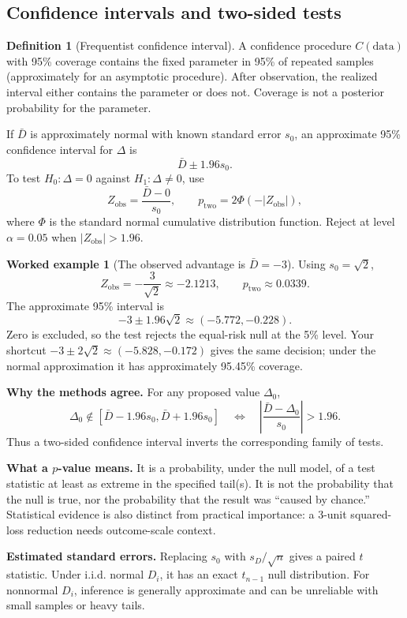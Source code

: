 \documentclass[11pt,letterpaper]{article}
\theoremstyle{definition}
\newtheorem{definition}[theorem]{Definition}
\newtheorem{example}[theorem]{Worked example}
\theoremstyle{remark}
\numberwithin{equation}{section}
\begin{document}
\subsection{Confidence intervals and two-sided tests}
\begin{definition}[Frequentist confidence interval]
A confidence procedure $C(\text{data})$ with 95\% coverage contains the fixed
parameter in 95\% of repeated samples (approximately for an asymptotic procedure).
After observation, the realized interval either contains the parameter or does
not. Coverage is not a posterior probability for the parameter.
\end{definition}
If $\bar D$ is approximately normal with known standard error $s_0$, an approximate
95\% confidence interval for $\Delta$ is
\begin{equation}
\bar D\pm1.96s_0.
\end{equation}
To test $H_0:\Delta=0$ against $H_1:\Delta\neq0$, use
\[
Z_{\mathrm{obs}}=\frac{\bar D-0}{s_0},\qquad
p_{\mathrm{two}}=2\Phi(-|Z_{\mathrm{obs}}|),
\]
where $\Phi$ is the standard normal cumulative distribution function.
Reject at level $\alpha=0.05$ when $|Z_{\mathrm{obs}}|>1.96$.

\begin{example}[The observed advantage is $\bar D=-3$]
Using $s_0=\sqrt2$,
\[
Z_{\mathrm{obs}}=-\frac3{\sqrt2}\approx-2.1213,
\qquad p_{\mathrm{two}}\approx0.0339.
\]
The approximate 95\% interval is
\[
-3\pm1.96\sqrt2\approx(-5.772,-0.228).
\]
Zero is excluded, so the test rejects the equal-risk null at the 5\% level.
Your shortcut $-3\pm2\sqrt2\approx(-5.828,-0.172)$ gives the same decision;
under the normal approximation it has approximately 95.45\% coverage.
\end{example}
\textbf{Why the methods agree.} For any proposed value $\Delta_0$,
\[
\Delta_0\notin[\bar D-1.96s_0,\bar D+1.96s_0]
\quad\Longleftrightarrow\quad
\left|\frac{\bar D-\Delta_0}{s_0}\right|>1.96.
\]
Thus a two-sided confidence interval inverts the corresponding family of tests.

\textbf{What a $p$-value means.} It is a probability, under the null model, of a
test statistic at least as extreme in the specified tail(s). It is not the
probability that the null is true, nor the probability that the result was
``caused by chance.'' Statistical evidence is also distinct from practical
importance: a 3-unit squared-loss reduction needs outcome-scale context.

\textbf{Estimated standard errors.} Replacing $s_0$ with $s_D/\sqrt n$ gives a
paired $t$ statistic. Under i.i.d. normal $D_i$, it has an exact $t_{n-1}$ null
distribution. For nonnormal $D_i$, inference is generally approximate and can
be unreliable with small samples or heavy tails.
\newpage
\end{document}
